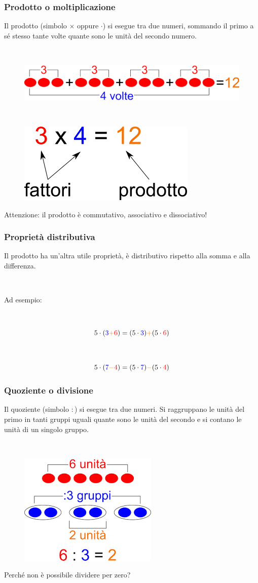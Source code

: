 \documentclass[handout]{beamer}
\theoremstyle{plain}
\begin{document}
\begin{frame}
\frametitle{Prodotto o moltiplicazione}
Il prodotto (simbolo $ \times $ oppure $ \cdot $) si esegue tra due numeri, sommando il primo a sé stesso tante volte quante sono le unità del secondo numero.

~

\begin{figure}
  \includegraphics[width=.8\columnwidth]{img/prodotto2.png}

  ~

  \includegraphics[width=.3\columnwidth]{img/prodotto.png}
\end{figure}\pause

Attenzione: il prodotto è commutativo, associativo e dissociativo!
\end{frame}


\begin{frame}
\frametitle{Proprietà distributiva}
Il prodotto ha un'altra utile proprietà, è distributivo rispetto alla somma e alla differenza. 

~

Ad esempio:

~

\[ 5 \cdot (\textcolor{blue}{3}\textcolor{orange}{+}\textcolor{red}{6}) = (5 \cdot \textcolor{blue}{3}) \textcolor{orange}{+} (5 \cdot \textcolor{red}{6})\]\pause

~

\[ 5 \cdot (\textcolor{blue}{7}\textcolor{orange}{-}\textcolor{red}{4}) = (5 \cdot \textcolor{blue}{7}) \textcolor{orange}{-} (5 \cdot \textcolor{red}{4})\]
\end{frame}


\begin{frame}
\frametitle{Quoziente o divisione}
Il quoziente (simbolo $ : $) si esegue tra due numeri. Si raggruppano le unità del primo in tanti gruppi uguali quante sono le unità del secondo e si contano le unità di un singolo gruppo.

~

\begin{figure}
  \includegraphics[width=.4\columnwidth]{img/divisione.png}
\end{figure}\pause

Perché non è possibile dividere per zero?
\end{frame}
\end{document}
